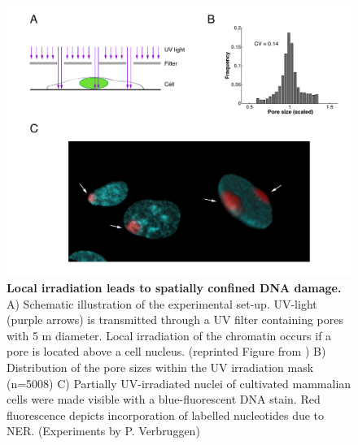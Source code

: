 \begin{figure}[t!]
	\begin{center}
		\includegraphics[width=1\textwidth]{Abbildungen/figure2_1.pdf}
		\caption{\textbf{Local irradiation leads to spatially confined DNA damage.} A) Schematic illustration of the experimental set-up. UV-light (purple arrows) is transmitted through a UV filter containing pores with 5 \textmu m diameter. Local irradiation of the chromatin occurs if a pore is located above a cell nucleus. (reprinted Figure from \cite{Terstiege2010}) B) Distribution of the pore sizes within the UV irradiation mask (n=5008) C) Partially UV-irradiated nuclei of cultivated mammalian cells were made visible with a blue-fluorescent DNA stain. Red fluorescence depicts incorporation of labelled nucleotides due to NER. (Experiments by P. Verbruggen)}
		\label{fig:accuMethod}
	\end{center}
\end{figure}

